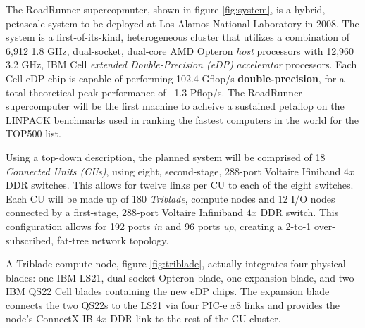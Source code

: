 \documentclass[letter,10pt]{article}
\newcommand{\note}[1]{\marginpar{\small{\color{red} #1}}}
\begin{document}
The RoadRunner supercopmuter, shown in figure \ref{fig:system}, is a hybrid, petascale system to be deployed at Los Alamos National Laboratory in 2008.  The system is a first-of-its-kind, heterogeneous cluster that utilizes a combination of 6,912 1.8 GHz, dual-socket, dual-core AMD Opteron \emph{host} processors with 12,960 3.2 GHz, IBM Cell \emph{extended Double-Precision (eDP)} \emph{accelerator} processors.  Each Cell eDP chip is capable of performing 102.4 Gflop/s \textbf{double-precision}, for a total theoretical peak performance of ~1.3 Pflop/s.  The RoadRunner supercomputer will be the first machine to acheive a sustained petaflop on the LINPACK benchmarks used in ranking the fastest computers in the world for the TOP500 list.\note{add TOP500 citation}

Using a top-down description, the planned system will be comprised of 18 \emph{Connected Units (CUs)}, using eight, second-stage, 288-port Voltaire Ifiniband $4x$ DDR switches.  This allows for twelve links per CU to each of the eight switches.  Each CU will be made up of 180 \emph{Triblade}, compute nodes and 12 I/O nodes connected by a first-stage, 288-port Voltaire Infiniband $4x$ DDR switch.  This configuration allows for 192 ports \emph{in} and 96 ports \emph{up}, creating a 2-to-1 over-subscribed, fat-tree network topology.


A Triblade compute node, figure \ref{fig:triblade}, actually integrates four physical blades: one IBM LS21, dual-socket Opteron blade, one expansion blade, and two IBM QS22 Cell blades containing the new eDP chips.  The expansion blade connects the two QS22s to the LS21 via four PIC-e $x8$ links and provides the node's ConnectX IB $4x$ DDR link to the rest of the CU cluster.




\end{document}
